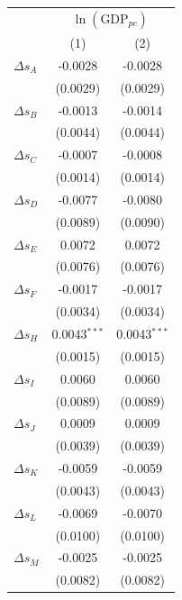 \begingroup
\centering
\begin{tabular}{lcc}
   \toprule
    & \multicolumn{2}{c}{$\ln(\text{GDP}_{pc})$}\\
                        & (1)            & (2)\\  
   \midrule 
   $\Delta s_A$         & -0.0028        & -0.0028\\   
                        & (0.0029)       & (0.0029)\\   
   $\Delta s_B$         & -0.0013        & -0.0014\\   
                        & (0.0044)       & (0.0044)\\   
   $\Delta s_C$         & -0.0007        & -0.0008\\   
                        & (0.0014)       & (0.0014)\\   
   $\Delta s_D$         & -0.0077        & -0.0080\\   
                        & (0.0089)       & (0.0090)\\   
   $\Delta s_E$         & 0.0072         & 0.0072\\   
                        & (0.0076)       & (0.0076)\\   
   $\Delta s_F$         & -0.0017        & -0.0017\\   
                        & (0.0034)       & (0.0034)\\   
   $\Delta s_H$         & 0.0043$^{***}$ & 0.0043$^{***}$\\   
                        & (0.0015)       & (0.0015)\\   
   $\Delta s_I$         & 0.0060         & 0.0060\\   
                        & (0.0089)       & (0.0089)\\   
   $\Delta s_J$         & 0.0009         & 0.0009\\   
                        & (0.0039)       & (0.0039)\\   
   $\Delta s_K$         & -0.0059        & -0.0059\\   
                        & (0.0043)       & (0.0043)\\   
   $\Delta s_L$         & -0.0069        & -0.0070\\   
                        & (0.0100)       & (0.0100)\\   
   $\Delta s_M$         & -0.0025        & -0.0025\\   
                        & (0.0082)       & (0.0082)\\   

\end{tabular}
